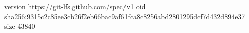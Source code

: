 version https://git-lfs.github.com/spec/v1
oid sha256:9315c2c85ee3cb26f2eb66bac9af61fca8c8256abd2801295dcf7d432d894e37
size 43840
